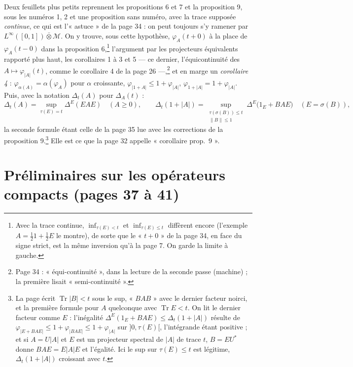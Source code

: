 \documentclass[11pt,a4paper]{article}
\begin{document}
Deux feuillets plus petits reprennent les propositions 6 et 7 et la
proposition 9, sous les numéros 1, 2 et une proposition sans numéro, avec
la trace supposée \emph{continue}, ce qui est l'« astuce » de la page 34 : on
peut toujours s'y ramener par $L^\infty([0,1]) \mathbin{\bar\otimes}
\mathcal{M}$. On y trouve, sous cette hypothèse, $\varphi_A(t{+}0)$ à la place
de $\varphi_A(t{-}0)$ dans la proposition 6,\footnote{Avec la trace continue,
$\inf_{\tau(E) < t}$ et $\inf_{\tau(E) \leq t}$ diffèrent encore (l'exemple
$A = \frac12 1 + \frac12 E$ le montre), de sorte que le « $t + 0$ » de la
page 34, en face du signe strict, est la même inversion qu'à la page 7. On
garde la limite à gauche.} l'argument par les projecteurs équivalents
rapporté plus haut, les corollaires 1 à 3 et 5 --- ce dernier,
l'équicontinuité des $A \mapsto \varphi_{|A|}(t)$, comme le corollaire 4 de
la page 26 ---,\footnote{Page 34 : « équi-continuité », dans la lecture de
la seconde passe (machine) ; la première lisait « semi-continuité ».} et en
marge un
\emph{corollaire 4} : $\varphi_{\alpha(A)} = \alpha(\varphi_A)$ pour $\alpha$
croissante, $\varphi_{|1+A|} \leq 1 + \varphi_{|A|}$, $\varphi_{1+|A|} = 1 +
\varphi_{|A|}$. Puis, avec la notation $\Delta_t(A)$ pour $\Delta_A(t)$ :
\[
  \Delta_t(A) = \sup_{\tau(E) = t} \Delta^{E}(EAE) \quad (A \geq 0), \qquad
  \Delta_t(1 + |A|) = \sup_{\substack{\tau(\sigma(B)) \leq t\\ \|B\| \leq 1}}
  \Delta^{E}\bigl(1_E + BAE\bigr) \quad (E = \sigma(B)),
\]
la seconde formule étant celle de la page 35 lue avec les corrections de la
proposition 9.\footnote{La page écrit $\operatorname{Tr}|B| < t$ sous le
sup, « $BAB$ » avec le dernier facteur noirci, et la première formule pour
$A$ quelconque avec $\operatorname{Tr} E < t$. On lit le dernier facteur
comme $E$ : l'inégalité $\Delta^{E}(1_E + BAE) \leq \Delta_t(1+|A|)$ résulte
de $\varphi_{|E + BAE|} \leq 1 + \varphi_{|BAE|} \leq 1 + \varphi_{|A|}$
sur $]0, \tau(E)[$, l'intégrande étant positive ; et si $A = U|A|$ et $E$ est
un projecteur spectral de $|A|$ de trace $t$, $B = EU^{*}$ donne
$BAE = E|A|E$ et l'égalité. Ici le sup sur $\tau(E) \leq t$ est légitime,
$\Delta_t(1+|A|)$ croissant avec $t$.} Elle est ce que la page 32 appelle « corollaire prop.\ 9 ».

\section*{Préliminaires sur les opérateurs compacts (pages 37 à 41)}
\end{document}
